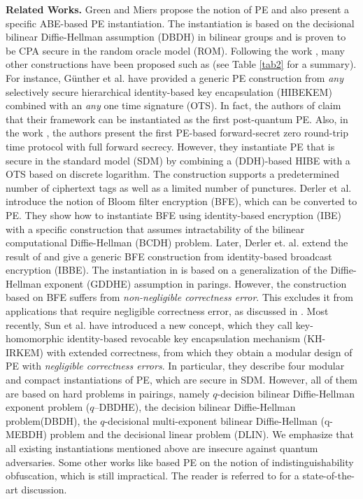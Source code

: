 \documentclass[runningheads,10pt]{llncs}
\begin{document}
\noindent \textbf{Related Works.} Green and Miers \cite{GM15}  
propose the notion of  PE  and also present a specific ABE-based PE instantiation. 
The instantiation is based on the decisional bilinear Diffie-Hellman assumption (DBDH) in bilinear groups 
and is proven to be CPA secure in the random oracle model (ROM). 
Following the work \cite{GM15}, many other constructions have been proposed such as \cite{CHN+16, CRRV17, GHJ+17,  DJSS18, SSS+20}
(see Table \ref{tab2} for a summary). For instance, 
G{\"u}nther et al. \cite{GHJ+17} have provided a generic PE construction
from \textit{any} selectively secure hierarchical identity-based key encapsulation (HIBEKEM) 
combined with an \textit{any} one time signature (OTS). 
In fact, the authors of \cite{GHJ+17} claim that their framework can be instantiated as the first post-quantum PE. 
Also, in the work \cite{GHJ+17}, the authors present the first PE-based forward-secret zero round-trip time protocol with full forward secrecy. 
However, they instantiate PE that is secure in the standard model (SDM) by 
combining a (DDH)-based HIBE with a OTS based on discrete logarithm.
The construction supports a predetermined  number of ciphertext tags as well as a limited number of punctures.
Derler et al. \cite{DJSS18} introduce the notion of Bloom filter encryption (BFE),
 which can be converted to PE.
They show how to instantiate
BFE using identity-based encryption (IBE) with a 
specific construction that assumes intractability of
the bilinear computational
Diffie-Hellman (BCDH) problem. 
Later, 
Derler et. al. \cite{DGJ+18-ePrint} extend the result of \cite{DJSS18} 
and give a generic BFE construction from identity-based broadcast encryption (IBBE). 
The instantiation in \cite{DGJ+18-ePrint} is based on a generalization of the Diffie-Hellman exponent (GDDHE) assumption in parings. 
However, the construction based on BFE suffers from \textit{non-negligible correctness error}. 
This excludes it from applications that require 
negligible correctness error, as discussed in \cite{SSS+20}.
Most recently, Sun et al. \cite{SSS+20} have introduced a new concept, 
which they call key-homomorphic identity-based revocable key encapsulation mechanism (KH-IRKEM) with extended correctness, 
from which 
they obtain a modular design of PE with \textit{negligible correctness errors}.
In particular, they describe four modular and compact instantiations of PE, which are secure in SDM.
However, all of them are  based on  hard problems in pairings, 
namely $q$-decision bilinear Diffie-Hellman exponent problem ($q$--DBDHE), 
the decision bilinear Diffie-Hellman problem(DBDH), 
the $q$-decisional multi-exponent
 bilinear Diffie-Hellman (q-MEBDH) problem and  
 the decisional linear problem (DLIN). 
 We emphasize that all existing instantiations mentioned above are insecure against quantum adversaries. 
Some other works like \cite{CRRV17, CHN+16}  based PE on the notion of indistinguishability obfuscation, which is still impractical. 
The reader is referred to \cite{SSS+20} for a state-of-the-art discussion. 
\end{document}
